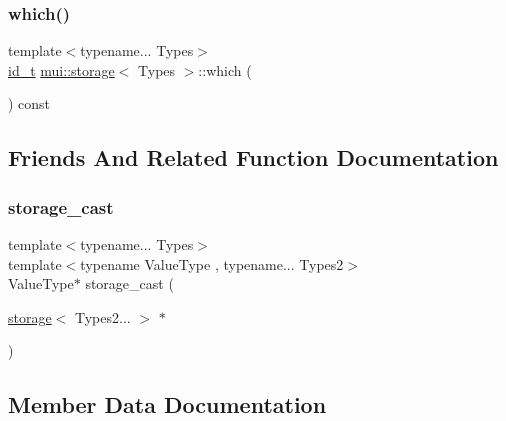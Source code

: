 \mbox{\label{structmui_1_1storage_aa7ed6b7701e979a4efc28714496cb974}} 
\subsubsection{\texorpdfstring{which()}{which()}}
{\footnotesize\ttfamily template$<$typename... Types$>$ \\
\hyperlink{structmui_1_1storage_a1e1d8c3e802463d4b0e3804865e365de}{id\+\_\+t} \hyperlink{structmui_1_1storage}{mui\+::storage}$<$ Types $>$\+::which (\begin{DoxyParamCaption}{ }\end{DoxyParamCaption}) const\hspace{0.3cm}{\ttfamily [inline]}}



\subsection{Friends And Related Function Documentation}
\mbox{\label{structmui_1_1storage_a08bdd07212e812605f031d71cde701b1}} 
\subsubsection{\texorpdfstring{storage\+\_\+cast}{storage\_cast}}
{\footnotesize\ttfamily template$<$typename... Types$>$ \\
template$<$typename Value\+Type , typename... Types2$>$ \\
Value\+Type$\ast$ storage\+\_\+cast (\begin{DoxyParamCaption}\item[{\hyperlink{structmui_1_1storage}{storage}$<$ Types2... $>$ $\ast$}]{ }\end{DoxyParamCaption})\hspace{0.3cm}{\ttfamily [friend]}}



\subsection{Member Data Documentation}
\mbox{\label{structmui_1_1storage_a6df80233e8d59cdb4c3bf93f6499d0db}} 
